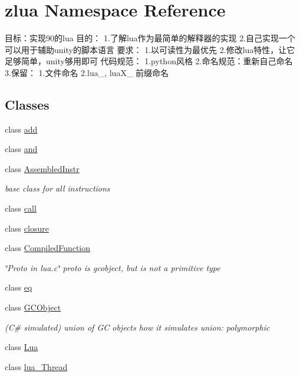 \hypertarget{namespacezlua}{}\section{zlua Namespace Reference}
\label{namespacezlua}


目标：实现90的lua 目的： 1.了解lua作为最简单的解释器的实现 2.自己实现一个可以用于辅助unity的脚本语言 要求： 1.以可读性为最优先 2.修改lua特性，让它足够简单，unity够用即可 代码规范： 1.\+python风格 2.命名规范：重新自己命名 3.保留： 1.文件命名 2.\+lua\+\_\+, lua\+X\+\_\+ 前缀命名  


\subsection*{Classes}
\begin{DoxyCompactItemize}
\item 
class \mbox{\hyperlink{classzlua_1_1add}{add}}
\item 
class \mbox{\hyperlink{classzlua_1_1and}{and}}
\item 
class \mbox{\hyperlink{classzlua_1_1_assembled_instr}{Assembled\+Instr}}
\begin{DoxyCompactList}\small\item\em base class for all instructions \end{DoxyCompactList}\item 
class \mbox{\hyperlink{classzlua_1_1call}{call}}
\item 
class \mbox{\hyperlink{classzlua_1_1closure}{closure}}
\item 
class \mbox{\hyperlink{classzlua_1_1_compiled_function}{Compiled\+Function}}
\begin{DoxyCompactList}\small\item\em \char`\"{}\+Proto in lua.\+c\char`\"{} proto is gcobject, but is not a primitive type \end{DoxyCompactList}\item 
class \mbox{\hyperlink{classzlua_1_1eq}{eq}}
\item 
class \mbox{\hyperlink{classzlua_1_1_g_c_object}{G\+C\+Object}}
\begin{DoxyCompactList}\small\item\em (C\# simulated) union of GC objects how it simulates union\+: polymorphic \end{DoxyCompactList}\item 
class \mbox{\hyperlink{classzlua_1_1_lua}{Lua}}
\item 
class \mbox{\hyperlink{classzlua_1_1lua___thread}{lua\+\_\+\+Thread}}

\end{DoxyCompactItemize}
